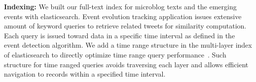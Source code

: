 
\noindent\textbf{Indexing:}
\label{index}
We built our full-text index for microblog texts and the emerging events with elasticsearch.
Event evolution tracking application issues extensive amount of keyword queries to retrieve related tweets for similarity computation.
Each query is issued toward data in a specific time interval as defined in the event detection algorithm. 
We add a time range structure in the multi-layer index of elasticsearch to directly optimize time range query performance~\cite{huang2015indexing}.
Such structure for time ranged queries avoids traversing each layer and allows efficient navigation to records within a specified time interval.




